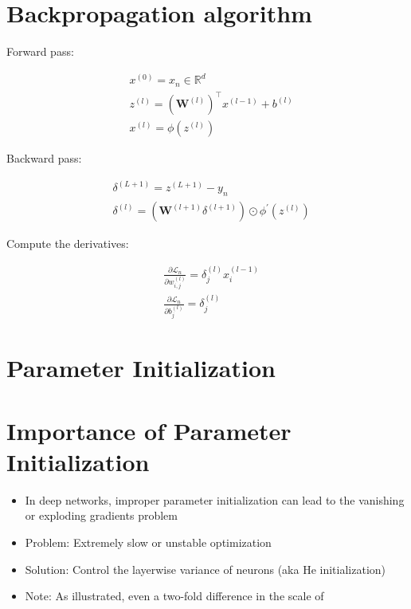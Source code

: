 \section*{Backpropagation algorithm}
Forward pass:

$$
\begin{aligned}
& x^{(0)}=x_{n} \in \mathbb{R}^{d} \\
& z^{(l)}=\left(\mathbf{W}^{(l)}\right)^{\top} x^{(l-1)}+b^{(l)} \\
& x^{(l)}=\phi\left(z^{(l)}\right)
\end{aligned}
$$

Backward pass:

$$
\begin{aligned}
& \delta^{(L+1)}=z^{(L+1)}-y_{n} \\
& \delta^{(l)}=\left(\mathbf{W}^{(l+1)} \delta^{(l+1)}\right) \odot \phi^{\prime}\left(z^{(l)}\right)
\end{aligned}
$$



Compute the derivatives:

$$
\begin{aligned}
& \frac{\partial \mathscr{L}_{n}}{\partial w_{i, j}^{(l)}}=\delta_{j}^{(l)} x_{i}^{(l-1)} \\
& \frac{\partial \mathscr{L}_{n}}{\partial b_{j}^{(l)}}=\delta_{j}^{(l)}
\end{aligned}
$$

\section*{Parameter Initialization}
\section*{Importance of Parameter Initialization}
\begin{itemize}
  \item In deep networks, improper parameter initialization can lead to the vanishing or exploding gradients problem

  \item Problem: Extremely slow or unstable optimization

  \item Solution: Control the layerwise variance of neurons (aka He initialization)

  \item Note: As illustrated, even a two-fold difference in the scale of

\end{itemize}



